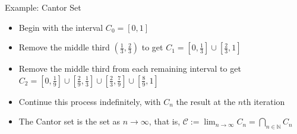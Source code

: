 \documentclass{beamer}
\begin{document}
\begin{frame}{Example: Cantor Set}

        
        

\begin{minipage}{0.6 \textwidth}
\small{
\begin{itemize}
        \item Begin with the interval $C_0 =[0,1]$
    \item Remove the middle third $(\frac{1}{3}, \frac{2}{3})$ to get $C_1 = [0, \frac{1}{3}] \cup [\frac{2}{3}, 1]$
    \item Remove the middle third from each remaining interval to get $C_2 = [0, \frac{1}{9}]\cup [\frac{2}{9}, \frac{1}{3}] \cup [\frac{2}{3}, \frac{7}{9}] \cup [\frac{8}{9}, 1]$
    \item Continue this process indefinitely, with $C_n$ the result at the $n$th iteration
    \item The Cantor set is the set as $n \to \infty$, that is, $\mathcal{C} := \lim _{n \to \infty}C_n= \bigcap \limits _{n\in \mathbb{N}}C_n$
    

\end{itemize}}
\end{minipage}
\end{frame}
\end{document}
